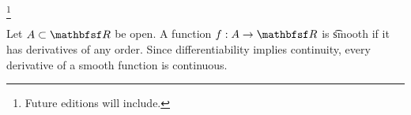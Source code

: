 
\footnote{Future editions will include.}


Let $A \subset \R$ be open.
A function $f: A \to \R$ is \t{smooth} if it has derivatives of any order.
Since differentiability implies continuity, every derivative of a smooth function is continuous.


\blankpage
